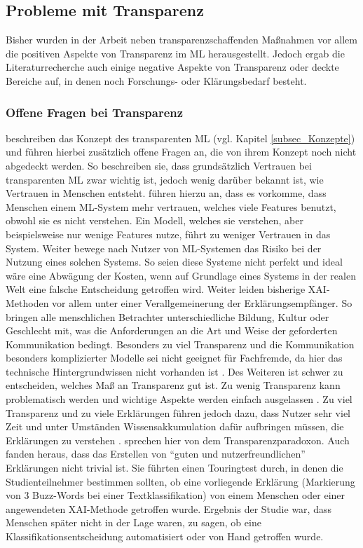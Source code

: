 \subsection{Probleme mit Transparenz}
Bisher wurden in der Arbeit neben transparenzschaffenden Maßnahmen vor allem die positiven Aspekte von Transparenz im ML herausgestellt. Jedoch ergab die Literaturrecherche auch einige negative Aspekte von Transparenz oder deckte Bereiche auf, in denen noch Forschungs- oder Klärungsbedarf besteht.

\subsubsection{Offene Fragen bei Transparenz} 
\cite{zhou20182d} beschreiben das Konzept des transparenten ML (vgl. Kapitel \ref{subsec_Konzepte}) und führen hierbei zusätzlich offene Fragen an, die von ihrem Konzept noch nicht abgedeckt werden. So beschreiben sie, dass grundsätzlich Vertrauen bei transparenten ML zwar wichtig ist, jedoch wenig darüber bekannt ist, wie Vertrauen in Menschen entsteht. \cite{vaughan2020human} führen hierzu an, dass es vorkomme, dass Menschen einem ML-System mehr vertrauen, welches viele Features benutzt, obwohl sie es nicht verstehen. Ein Modell, welches sie verstehen, aber beispielsweise nur wenige Features nutze, führt zu weniger Vertrauen in das System.
Weiter bewege nach \cite{zhou20182d} Nutzer von ML-Systemen das Risiko bei der Nutzung eines solchen Systems. So seien diese Systeme nicht perfekt und ideal wäre eine Abwägung der Kosten, wenn auf Grundlage eines Systems in der realen Welt eine falsche Entscheidung getroffen wird. Weiter leiden bisherige XAI-Methoden vor allem unter einer Verallgemeinerung der Erklärungsempfänger. So bringen alle menschlichen Betrachter unterschiedliche Bildung, Kultur oder Geschlecht mit, was die Anforderungen an die Art und Weise der geforderten Kommunikation bedingt.
Besonders zu viel Transparenz und die Kommunikation besonders komplizierter Modelle sei nicht geeignet für Fachfremde, da hier das technische Hintergrundwissen nicht vorhanden ist \cite{de2018algorithmic}. Des Weiteren ist schwer zu entscheiden, welches Maß an Transparenz gut ist. Zu wenig Transparenz kann problematisch werden \cite{kulesza2013too} und wichtige Aspekte werden einfach ausgelassen \cite{blacklaws2018algorithms}. Zu viel Transparenz und zu viele Erklärungen führen jedoch dazu, dass Nutzer sehr viel Zeit und unter Umständen Wissensakkumulation dafür aufbringen müssen, die Erklärungen zu verstehen \cite{blacklaws2018algorithms}. \cite{blacklaws2018algorithms} sprechen hier von dem Transparenzparadoxon.
Auch \cite{biessmann2021turing} fanden heraus, dass das Erstellen von \enquote{guten und nutzerfreundlichen} Erklärungen nicht trivial ist. Sie führten einen Touringtest durch, in denen die Studienteilnehmer bestimmen sollten, ob eine vorliegende Erklärung (Markierung von 3 Buzz-Words bei einer Textklassifikation) von einem Menschen oder einer angewendeten XAI-Methode getroffen wurde. Ergebnis der Studie war, dass Menschen später nicht in der Lage waren, zu sagen, ob eine Klassifikationsentscheidung automatisiert oder von Hand getroffen wurde.

